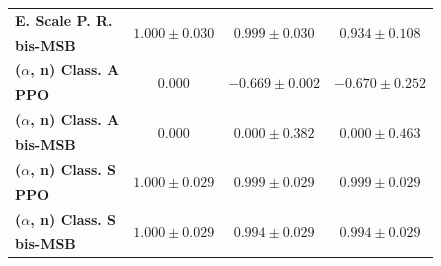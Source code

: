 \begin{table}
\begin{tabular}{lccc}
        \textbf{E. Scale P. R.} & \multirow{2}{*}{$1.000\pm0.030$} & \multirow{2}{*}{$0.999\pm0.030$} & \multirow{2}{*}{$0.934\pm0.108$} \\
        \textbf{bis-MSB} & & & \\
        \hline

        \textbf{($\alpha$, n) Class. A} & \multirow{2}{*}{$0.000$} & \multirow{2}{*}{$-0.669\pm0.002$} & \multirow{2}{*}{$-0.670\pm0.252$} \\
        \textbf{PPO} & & & \\
        \hline

        \textbf{($\alpha$, n) Class. A} & \multirow{2}{*}{$0.000$} & \multirow{2}{*}{$0.000\pm0.382$} & \multirow{2}{*}{$0.000\pm0.463$} \\
        \textbf{bis-MSB} & & & \\
        \hline

        \textbf{($\alpha$, n) Class. S} & \multirow{2}{*}{$1.000\pm0.029$} & \multirow{2}{*}{$0.999\pm0.029$} & \multirow{2}{*}{$0.999\pm0.029$} \\
        \textbf{PPO} & & & \\
        \hline

        \textbf{($\alpha$, n) Class. S} & \multirow{2}{*}{$1.000\pm0.029$} & \multirow{2}{*}{$0.994\pm0.029$} & \multirow{2}{*}{$0.994\pm0.029$} \\
        \textbf{bis-MSB} & & & \\
        \hline

        \hline\hline
    \end{tabular}
\end{table}
